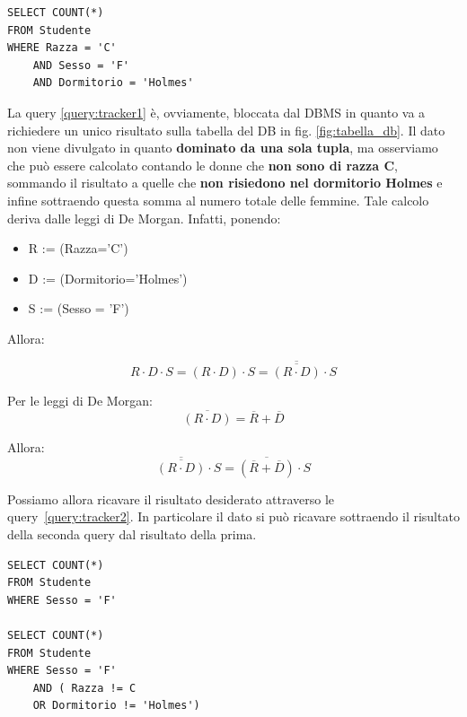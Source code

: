 \begin{algorithm}
\begin{lstlisting}[caption={Esempio di query di tracker non lecita du DB \label{query:tracker1}}] 
SELECT COUNT(*)
FROM Studente
WHERE Razza = 'C'
	AND Sesso = 'F'
	AND Dormitorio = 'Holmes'
\end{lstlisting}
\end{algorithm}

La query \ref{query:tracker1} è, ovviamente, bloccata dal DBMS in quanto va a richiedere un unico risultato sulla tabella del DB in fig. \ref{fig:tabella_db}. Il dato non viene divulgato in quanto \textbf{dominato da una sola tupla}, ma osserviamo che può essere calcolato contando le donne che \textbf{non sono di razza C}, sommando il risultato a quelle che \textbf{non risiedono nel dormitorio Holmes} e infine sottraendo questa somma al numero totale delle femmine. Tale calcolo deriva dalle leggi di De Morgan. Infatti, ponendo:

\begin{itemize}
\item R := (Razza='C')
\item D := (Dormitorio='Holmes')
\item S := (Sesso = 'F')
\end{itemize}

Allora:

\begin{equation}
R \cdot D \cdot S = (R \cdot D) \cdot S =\overline{\overline{(R \cdot D)}} \cdot S
\end{equation}

Per le leggi di De Morgan:
\begin{equation}
\overline{(R \cdot D)} = \overline{R} + \overline{D}
\end{equation}

Allora:
\begin{equation} \label{eq:tracker}
\overline{\overline{(R \cdot D)}} \cdot S = \overline{(\overline{R} + \overline{D})} \cdot S
\end{equation}

Possiamo allora ricavare il risultato desiderato attraverso le query~\ref{query:tracker2}. In particolare il dato si può ricavare sottraendo il risultato della seconda query dal risultato della prima.
\begin{algorithm}
\begin{lstlisting}[caption={Esempio di query di tracker lecita du DB \label{query:tracker2}}] 
SELECT COUNT(*)
FROM Studente
WHERE Sesso = 'F'
	
SELECT COUNT(*)
FROM Studente
WHERE Sesso = 'F'
	AND ( Razza != C
	OR Dormitorio != 'Holmes')
\end{lstlisting}
\end{algorithm}


